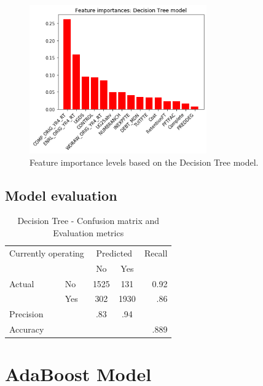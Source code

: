 \documentclass[11pt, letterpaper]{article}
\begin{document}
\begin{figure}[h]
\begin{center}
\includegraphics[width=3in]{DTFeatureImportance.png}
\caption{Feature importance levels based on the Decision Tree model.} 
\label{fig:DTFeatures}
\end{center}
\end{figure}

\subsection{Model evaluation}

\begin{table}[h]
\begin{center}
\caption{Decision Tree - Confusion matrix and Evaluation metrics}
\begin{tabular}{l l | c c r }
\multicolumn{2}{l}{Currently operating} & \multicolumn{2}{c}{Predicted} & Recall \\
& & No & Yes &  \\ 
\cline{2-5}
Actual & No & 1525 &  131 & 0.92 \\
& Yes & 302 &1930 & .86 \\  \hline
Precision&  & .83 & .94 \\ 
Accuracy & & &  & .889 \\
\end{tabular}
\label{tab:DTConfusion}
\end{center}
\end{table} 


\section{AdaBoost Model}
\end{document}
